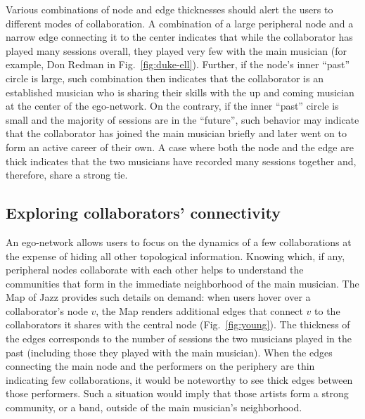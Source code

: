 \documentclass[12pt]{cmuthesis}
\begin{document}
  Various combinations of node and edge thicknesses should alert the users to
  different modes of collaboration. A combination of a large peripheral node and a
  narrow edge connecting it to the center indicates that while the collaborator
  has played many sessions overall, they played very few with the main musician
  (for example, Don Redman in Fig.~\ref{fig:duke-ell}).
  Further, if the node's inner ``past'' circle is large, such combination then
  indicates that the collaborator is an established musician who is sharing their
  skills with the up and coming musician at the center of the ego-network. On the
  contrary, if the inner ``past'' circle is small and the majority of sessions are
  in the ``future'', such behavior may indicate that the collaborator has joined
  the main musician briefly and later went on to form an active career of their
  own. A case where both the node and the edge are thick indicates that the two
  musicians have recorded many sessions together and, therefore, share a strong
  tie.


  \subsection{Exploring collaborators' connectivity}

  An ego-network allows users to focus on the dynamics of a few collaborations at
  the expense of hiding all other topological information. Knowing which, if any,
  peripheral nodes collaborate with each other helps to understand the communities
  that form in the immediate neighborhood of the main musician. The Map of Jazz
  provides such details on demand: when users hover over a collaborator's node $v$,
  the Map renders additional edges that connect $v$ to the collaborators it shares
  with the central node (Fig.~\ref{fig:young}). The thickness of the edges
  corresponds to the number of
  sessions the two musicians played in the past (including those they played
  with the main musician). When the edges connecting the main node and the
  performers on the periphery are thin indicating few collaborations, it would be
  noteworthy to see thick edges between those performers. Such a situation would
  imply that those artists form a strong community, or a band, outside of the main
  musician's neighborhood.
\end{document}
